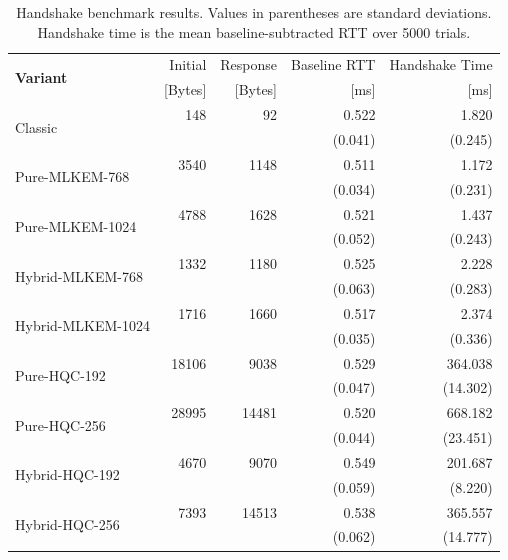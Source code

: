 \newpage
\vspace*{3cm}
\begin{table}[H]
\centering
\begin{tabular}{|l|rrrr|}
\hline
\multirow{2}{*}{\textbf{Variant}} & Initial & Response & Baseline RTT & Handshake Time \\
                         & [Bytes] & [Bytes] & [ms] & [ms] \\
\hline
\multirow{2}{*}{Classic} & 148 & 92 & 0.522 & 1.820 \\
                         &  &  & (0.041) & (0.245) \\
\hline
\multirow{2}{*}{Pure-MLKEM-768} & 3540 & 1148 & 0.511 & 1.172 \\
                         &  &  & (0.034) & (0.231) \\
\hline
\multirow{2}{*}{Pure-MLKEM-1024} & 4788 & 1628 & 0.521 & 1.437 \\
                         &  &  & (0.052) & (0.243) \\
\hline
\multirow{2}{*}{Hybrid-MLKEM-768} & 1332 & 1180 & 0.525 & 2.228 \\
                         &  &  & (0.063) & (0.283) \\
\hline
\multirow{2}{*}{Hybrid-MLKEM-1024} & 1716 & 1660 & 0.517 & 2.374 \\
                         &  &  & (0.035) & (0.336) \\
\hline
\multirow{2}{*}{Pure-HQC-192} & \num{18106} & 9038 & 0.529 & 364.038 \\
                         &  &  & (0.047) & (14.302) \\
\hline
\multirow{2}{*}{Pure-HQC-256} & \num{28995} & \num{14481} & 0.520 & 668.182 \\
                         &  &  & (0.044) & (23.451) \\
\hline
\multirow{2}{*}{Hybrid-HQC-192} & 4670 & 9070 & 0.549 & 201.687 \\
                         &  &  & (0.059) & (8.220) \\
\hline
\multirow{2}{*}{Hybrid-HQC-256} & 7393 & \num{14513} & 0.538 & 365.557 \\
                         &  &  & (0.062) & (14.777) \\
\hline
\end{tabular}
\caption{Handshake benchmark results. Values in parentheses are standard deviations. Handshake time is the mean baseline-subtracted RTT over 5000 trials.}
\label{tab:Results}
\end{table}

